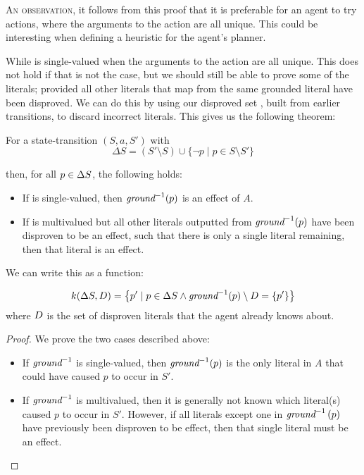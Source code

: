 \documentclass[../Master.tex]{subfiles}
\begin{document}
\textsc{An observation}, it follows from this proof that it is preferable for an agent to try actions, where the arguments to the action are all unique. This could be interesting when defining a heuristic for the agent's planner. 

While \invground is single-valued when the arguments to the action are all unique. 
This does not hold if that is not the case, but we should still be able to prove some of the literals; provided all other literals that map from the same grounded literal have been disproved. We can do this by using our disproved set \Dsp, built from earlier transitions, to discard incorrect literals. This gives us the following theorem: 

\begin{theorem}\label{thm:nca:prove-effects} For a state-transition $(S,a,S')$ with 
	\begin{equation*}
	\Delta S = \left(S' \setminus S\right) \cup \{\neg p \mid  p \in S \setminus S' \}
	\end{equation*}
	
	then, for all $p \in \Delta S$, the following holds:
	
    \begin{itemize}
        \item If \invground is single-valued, then $\textit{ground} ^{-1}(p)$ is an effect of $A$.
        \item If \invground is multivalued but all other literals outputted from $\textit{ground} ^{-1}(p)$ have been disproven to be an effect, 
        such that there is only a single literal remaining, then that literal is an effect.
    \end{itemize}

	We can write this as a function:
	
	\begin{equation*}
	k(\Delta S,D) = 
	\left\{
		p' \mid 
				p \in \Delta S \land 
				\textit{ground} ^{-1}(p) \setminus D = \{p'\}
		\right\}
	\end{equation*}
	where $D$ is the set of disproven literals that the agent already knows about.
\end{theorem}
	
\begin{proof}
    We prove the two cases described above:
    \begin{itemize}
        \item If $\textit{ground} ^{-1}$ is single-valued, then $\textit{ground} ^{-1} (p)$ is the only literal in $A$ that could have caused $p$ to occur in $S'$.
        \item If $\textit{ground} ^{-1}$ is multivalued, then it is generally not known which literal(s) caused $p$ to occur in $S'$. However, if all literals except one in $\textit{ground} ^{-1}\left( p \right)$ have previously been disproven to be effect, then that single literal must be an effect. 
    \end{itemize}
\end{proof}
\end{document}
